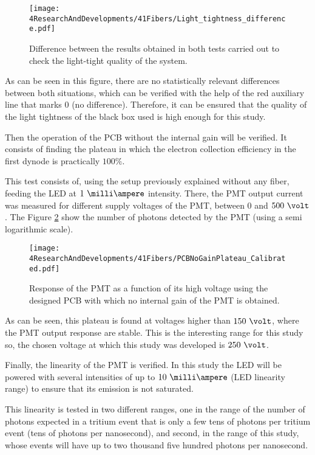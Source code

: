 \begin{figure}[h]
\centering
\texttt{[image: 4ResearchAndDevelopments/41Fibers/Light\_tightness\_difference.pdf]}
\caption{Difference between the results obtained in both tests carried out to check the light-tight quality of the system.\label{fig:LightTightnessTest}}
\end{figure}

As can be seen in this figure, there are no statistically relevant differences between both situations, which can be verified with the help of the red auxiliary line that marks 0 (no difference). Therefore, it can be ensured that the quality of the light tightness of the black box used is high enough for this study.

Then the operation of the PCB without the internal gain will be verified. It consists of finding the plateau in which the electron collection efficiency in the first dynode is practically $100\%$. 

This test consists of, using the setup previously explained without any fiber, feeding the LED at $1~\milli\ampere$ intensity. There, the PMT output current was measured for different supply voltages of the PMT, between $0$ and $500~\volt$. The Figure \ref{fig:PlateauNoGainPMT} show the number of photons detected by the PMT (using a semi logarithmic scale).

\begin{figure}[h]
\centering
\texttt{[image: 4ResearchAndDevelopments/41Fibers/PCBNoGainPlateau\_Calibrated.pdf]}
\caption{Response of the PMT as a function of its high voltage using the designed PCB with which no internal gain of the PMT is obtained.\label{fig:PlateauNoGainPMT}}
\end{figure}

As can be seen, this plateau is found at voltages higher than $150~\volt$, where the PMT output response are stable. This is the interesting range for this study so, the chosen voltage at which this study was developed is $250~\volt$.

Finally, the linearity of the PMT is verified. In this study the LED will be powered with several intensities of up to $10~\milli\ampere$ (LED linearity range) to ensure that its emission is not saturated.

This linearity is tested in two different ranges, one in the range of the number of photons expected in a tritium event that is only a few tens of photons per tritium event (tens of photons per nanosecond), and second, in the range of this study, whose events will have up to two thousand five hundred photons per nanosecond.

